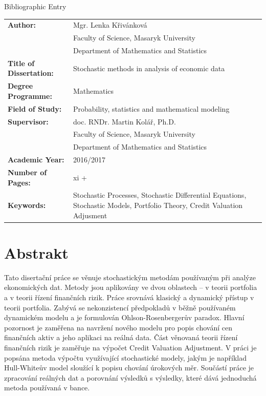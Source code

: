 \documentclass[a4paper,12pt]{report}
\theoremstyle{definition} \newtheorem{definice}[veta]{Definice}
\theoremstyle{remark}
\begin{document}
\begin{flushright} {{\Huge Bibliographic Entry}} \vspace{38pt} \end{flushright}

\hspace{-0.7cm}
\begin{tabular}{p{4.5cm}  p{8.5cm}}
\textbf{Author:} & Mgr. Lenka Křivánková \\
& Faculty of Science, Masaryk University \\
& Department of Mathematics and Statistics \\
\textbf{Title of Dissertation:} & Stochastic methods in analysis of economic data \\
\textbf{Degree Programme:} & Mathematics \\
\textbf{Field of Study:} & Probability, statistics and mathematical modeling \\
\textbf{Supervisor:} & doc. RNDr. Martin Kolář, Ph.D.  \\
& Faculty of Science, Masaryk University \\
& Department of Mathematics and Statistics \\
\textbf{Academic Year:} &2016/2017 \\
\textbf{Number of Pages:} & xi + \pageref*{LastPage} \\
\textbf{Keywords:} & Stochastic Processes, Stochastic Differential Equations, Stochastic Models, Portfolio Theory, Credit Valuation Adjusment\\
\end{tabular}

\chapter*{Abstrakt}
\thispagestyle{empty}
Tato disertační práce se věnuje stochastickým metodám používaným při analýze ekonomických dat.
Metody jsou aplikovány ve dvou oblastech -- v teorii portfolia a v teorii řízení finančních rizik.
Práce srovnává klasický a dynamický přístup v teorii portfolia.
Zabývá se nekonzistencí předpokladů v běžně používaném dynamickém modelu a je formulován Ohlson-Rosenbergerův paradox.
Hlavní pozornost je zaměřena na navržení nového modelu pro popis chování cen finančních aktiv a jeho aplikaci na reálná data.
Část věnovaná teorii řízení finančních rizik je zaměřuje na výpočet Credit Valuation Adjustment. 
V práci je popsána metoda výpočtu využívající stochastické modely, jakým je například Hull-Whiteův model sloužící k popisu chování úrokových měr.
Součástí práce je zpracování reálných dat a porovnání výsledků s výsledky, které dává jednoduchá metoda používaná v bance.
\\\\\\\\\\
\end{document}
